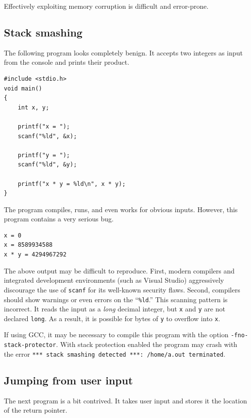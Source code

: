 \documentclass{book}
\begin{document}
Effectively exploiting memory corruption is difficult and error-prone.

\subsection{Stack smashing}

The following program looks completely benign. It accepts two integers as input from the console and prints their product.

\begin{lstlisting}[caption={todo}, captionpos=b, mathescape, xleftmargin=.25in, xrightmargin=.25in]
#include <stdio.h>
void main()
{
    int x, y;
    
    printf("x = ");
    scanf("%ld", &x);
    
    printf("y = ");
    scanf("%ld", &y);
    
    printf("x * y = %ld\n", x * y);
}
\end{lstlisting}

The program compiles, runs, and even works for obvious inputs. However, this program contains a very serious bug.

\begin{lstlisting}[caption={todo}, captionpos=b, mathescape, xleftmargin=.25in, xrightmargin=.25in]
x = 0
x = 8589934588
x * y = 4294967292
\end{lstlisting}

The above output may be difficult to reproduce. First, modern compilers and integrated development environments (such as Visual Studio) aggressively discourage the use of \texttt{scanf} for its well-known security flaws. Second, compilers should show warnings or even errors on the ``\texttt{\%ld}.'' This scanning pattern is incorrect. It reads the input as a \textit{long} decimal integer, but \texttt{x} and \texttt{y} are not declared \texttt{long}. As a result, it is possible for bytes of \texttt{y} to overflow into \texttt{x}.

If using GCC, it may be necessary to compile this program with the option \texttt{-fno-stack-protector}. With stack protection enabled the program may crash with the error \texttt{*** stack smashing detected ***: /home/a.out terminated}.

\subsection{Jumping from user input}
The next program is a bit contrived. It takes user input and stores it the location of the return pointer.
\end{document}

